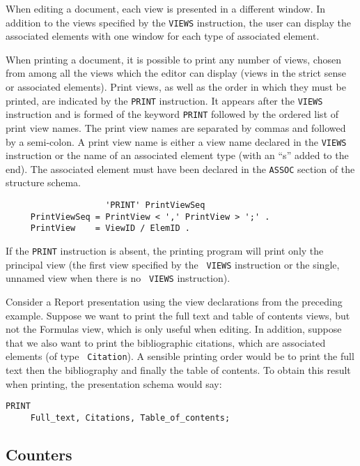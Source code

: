When editing a document, each view is presented in a different
window.  In addition to the views specified by the {\tt VIEWS}
instruction, the user can display the associated elements with one
window for each type of associated element.

When printing a document, it is possible to print any number of views,
chosen from among all the views which the editor can display (views in
the strict sense or associated elements).  Print views, as well as the
order in which they must be printed, are indicated by the {\tt PRINT}
instruction.  It appears after the {\tt VIEWS} instruction and is
formed of the keyword {\tt PRINT} followed by the ordered list of
print view names.  The print view names are separated by commas and
followed by a semi-colon.  A print view name is either a view name
declared in the {\tt VIEWS} instruction or the name of an associated
element type (with an ``s'' added to the end).  The associated element
must have been declared in the {\tt ASSOC} section of the structure
schema.

\begin{verbatim}
                    'PRINT' PrintViewSeq
     PrintViewSeq = PrintView < ',' PrintView > ';' .
     PrintView    = ViewID / ElemID .
\end{verbatim}

If the {\tt PRINT} instruction is absent, the printing program will
print only the principal view (the first view specified by the {\tt
VIEWS} instruction or the single, unnamed view when there is no {\tt
VIEWS} instruction).

\begin{example}
Consider a Report presentation using the view declarations from the
preceding example.  Suppose we want to print the full text and table
of contents views, but not the Formulas view, which is only useful
when editing.  In addition, suppose that we also want to print the
bibliographic citations, which are associated elements (of type {\tt
Citation}).  A sensible printing order would be to print the full text
then the bibliography and finally the table of contents.  To obtain
this result when printing, the presentation schema would say:

\begin{verbatim}
PRINT
     Full_text, Citations, Table_of_contents;
\end{verbatim}
\end{example}

\subsection{Counters}

